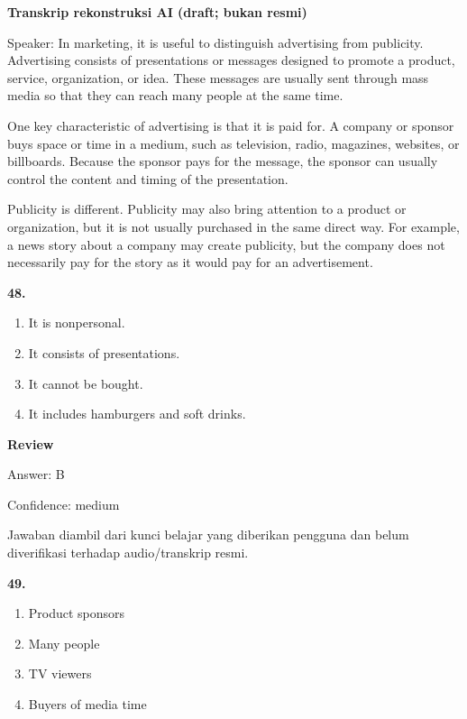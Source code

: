 \documentclass[12pt]{article}
\begin{document}
\begin{exampleblock}
\textbf{Transkrip rekonstruksi AI (draft; bukan resmi)}\par
Speaker: In marketing, it is useful to distinguish advertising from publicity. Advertising consists of presentations or messages designed to promote a product, service, organization, or idea. These messages are usually sent through mass media so that they can reach many people at the same time.\par
One key characteristic of advertising is that it is paid for. A company or sponsor buys space or time in a medium, such as television, radio, magazines, websites, or billboards. Because the sponsor pays for the message, the sponsor can usually control the content and timing of the presentation.\par
Publicity is different. Publicity may also bring attention to a product or organization, but it is not usually purchased in the same direct way. For example, a news story about a company may create publicity, but the company does not necessarily pay for the story as it would pay for an advertisement.\par
\end{exampleblock}
\noindent\textbf{48.}
\begin{enumerate}[label=(\Alph*),leftmargin=*,itemsep=0.2em]
\item It is nonpersonal.
\item It consists of presentations.
\item It cannot be bought.
\item It includes hamburgers and soft drinks.
\end{enumerate}
\par
\begingroup
\setlength{\parskip}{0pt}
\setlength{\parindent}{0pt}
\textbf{Review}\par
Answer: B\par
Confidence: medium\par
Jawaban diambil dari kunci belajar yang diberikan pengguna dan belum diverifikasi terhadap audio/transkrip resmi.\par
\endgroup
\par
\vspace{0.25\baselineskip}
\noindent\textbf{49.}
\begin{enumerate}[label=(\Alph*),leftmargin=*,itemsep=0.2em]
\item Product sponsors
\item Many people
\item TV viewers
\item Buyers of media time
\end{enumerate}
\end{document}
